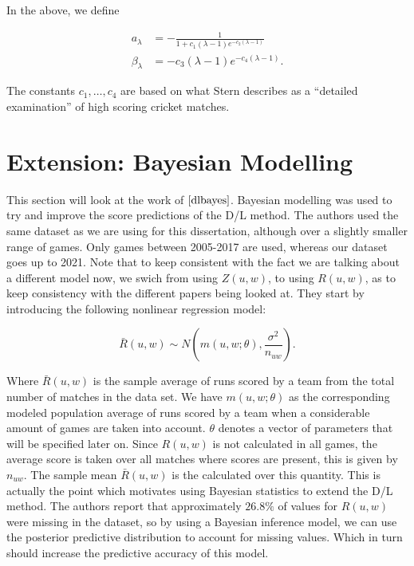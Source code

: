 In the above, we define 

\begin{align*}
    a_\lambda &= -\frac{1}{1+c_1(\lambda-1)e^{-c_2(\lambda-1)}}\\
    \beta_\lambda &= -c_3(\lambda-1)e^{-c_4(\lambda-1)}.
\end{align*}

The constants $c_1,\ldots,c_4$ are based on what Stern describes as a ``detailed examination'' of high scoring cricket matches.

\section{Extension: Bayesian Modelling}
This section will look at the work of $\cite{dlbayes}$. Bayesian modelling was used to try and improve the score predictions
of the D/L method. The authors used the same dataset as we are using for this dissertation, although over a slightly smaller range of games.
Only games between 2005-2017 are used, whereas our dataset goes up to 2021. Note that to keep consistent with the fact we are talking about a different
model now, we swich from using $Z(u,w)$, to using $R(u,w)$, as to keep consistency with the different papers being looked at.
They start by introducing the following nonlinear regression model:

\begin{equation}
    \label{dlRegress}
    \bar{R}(u,w) \sim N(m(u,w;\theta),\frac{\sigma^2}{n_{uw}}).
\end{equation}

Where $\bar{R}(u,w)$ is the sample average of runs scored by a team from the total number of matches in the data set. We have $m(u,w;\theta)$
as the corresponding modeled population average of runs scored by a team when a considerable amount of games are taken into account. $\theta$ denotes 
a vector of parameters that will be specified later on. Since $R(u,w)$ is not calculated in all games, the average score is taken over all matches where
scores are present, this is given by $n_{uw}$. The sample mean $\bar{R}(u,w)$ is the calculated over this quantity. This is actually the point which motivates
using Bayesian statistics to extend the D/L method. The authors report that approximately $26.8\%$ of values for $R(u,w)$ were missing in the dataset, so by 
using a Bayesian inference model, we can use the posterior predictive distribution to account for missing values. Which in turn should increase the 
predictive accuracy of this model. \\

